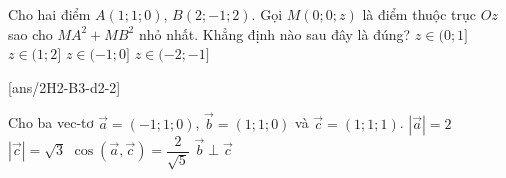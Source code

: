 \begin{ex}
	Cho hai điểm $A(1;1;0)$, $B(2;-1;2)$. Gọi $M(0;0;z)$ là điểm thuộc trục $Oz$ sao cho $MA^2+MB^2$ nhỏ nhất. Khẳng định nào sau đây là đúng?
	\choice
	{\True $z \in (0;1]$}
	{$z \in (1;2]$}
	{$z \in (-1;0]$}
	{$z \in (-2;-1]$}

\end{ex} 

\TNTF
{}[ans/2H2-B3-d2-2]

\begin{ex}
	Cho ba vec-tơ $ \overrightarrow a=(-1;1;0)$, $ \overrightarrow b=(1;1;0)$ và $ \overrightarrow c=(1;1;1)$.
	\choiceTF
	{$\left| {\overrightarrow a } \right| = 2$}
	{\True $\left| {\overrightarrow c } \right| = \sqrt 3 $}
	{$\cos\left(\vec{a},\vec{c} \right)=\dfrac{2}{\sqrt{5}}$}
	{ $\overrightarrow b \perp \overrightarrow c$}
\end{ex} 

